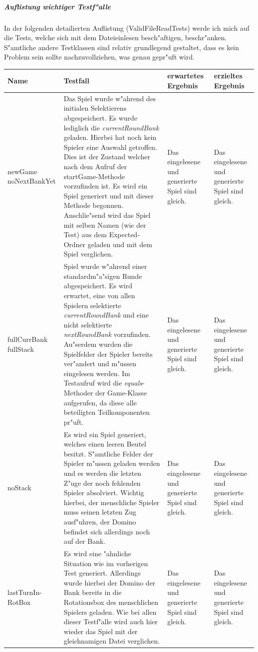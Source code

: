 \subparagraph{Auflistung wichtiger Testf"alle}
In der folgenden detailierten Auflistung (ValidFileReadTests) werde ich mich auf die Tests, welche sich mit dem Dateieinlesen besch"aftigen, beschr"anken. S"amtliche andere Testklassen sind relativ grundlegend gestaltet, dass es kein Problem sein sollte nachzuvollziehen, was genau gepr"uft wird. 

\bigbreak

\begin{tabular}{|p{2cm}|p{7cm}|p{2cm}|p{2cm}|}
	\hline
	Name & Testfall & erwartetes Ergebnis & erzieltes Ergebnis \\
	\hline
	\hline
	newGame noNextBankYet & Das Spiel wurde w"ahrend des initialen Selektierens abgespeichert. Es wurde lediglich die \emph{currentRoundBank} geladen. Hierbei hat noch kein Spieler eine Auswahl getroffen. Dies ist der Zustand welcher nach dem Aufruf der startGame-Methode vorzufinden ist. Es wird ein Spiel generiert und mit dieser Methode begonnen. Anschlie"send wird das Spiel mit selben Namen (wie der Test) aus dem Expected-Ordner geladen und mit dem Spiel verglichen. & Das eingelesene und generierte Spiel sind gleich. & Das eingelesene und generierte Spiel sind gleich. \\
		
	fullCurrBank fullStack & Spiel wurde w"ahrend einer standardm"a"sigen Runde abgespeichert. Es wird erwartet, eine von allen Spielern selektierte \emph{currentRoundBank} und eine nicht selektierte \emph{nextRoundBank} vorzufinden. Au"serdem wurden die Spielfelder der Spieler bereits ver"andert und m"ussen eingelesen werden. Im Testaufruf wird die \emph{equals}-Methoder der Game-Klasse aufgerufen, da diese alle beteiligten Teilkomponenten pr"uft. & Das eingelesene und generierte Spiel sind gleich. & Das eingelesene und generierte Spiel sind gleich. \\
	
	noStack & Es wird ein Spiel generiert, welches einen leeren Beutel besitzt. S"amtliche Felder der Spieler m"ussen geladen werden und es werden die letzten Z"uge der noch fehlenden Spieler absolviert. Wichtig hierbei, der menschliche Spieler muss seinen letzten Zug ausf"uhren, der Domino befindet sich allerdings noch auf der Bank. & Das eingelesene und generierte Spiel sind gleich. & Das eingelesene und generierte Spiel sind gleich. \\
	
	lastTurnIn- \newline RotBox & Es wird eine "ahnliche Situation wie im vorherigen Test generiert. Allerdings wurde hierbei der Domino der Bank bereits in die Rotationsbox des menschlichen Spielers geladen. Wie bei allen dieser Testf"alle wird auch hier wieder das Spiel mit der gleichnamigen Datei verglichen. & Das eingelesene und generierte Spiel sind gleich. & Das eingelesene und generierte Spiel sind gleich. \\	
	\hline
\end{tabular}

